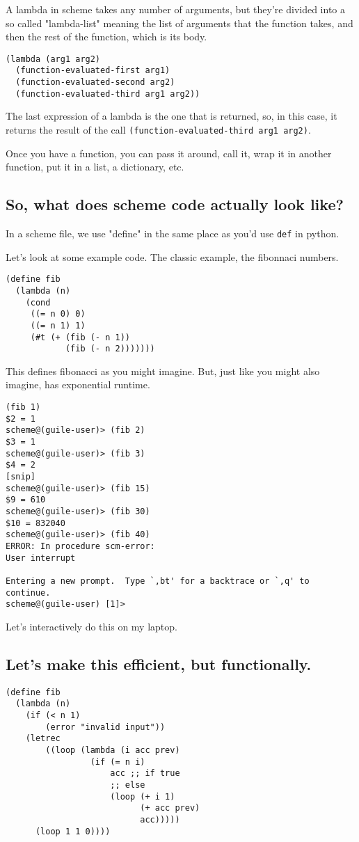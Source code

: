 \documentclass[11pt]{article}
\begin{document}
A lambda in scheme takes any number of arguments, but they're
divided into a so called "lambda-list" meaning the list of
arguments that the function takes, and then the rest of the
function, which is its body. 

\begin{verbatim}
(lambda (arg1 arg2)
  (function-evaluated-first arg1)
  (function-evaluated-second arg2)
  (function-evaluated-third arg1 arg2))
\end{verbatim}

The last expression of a lambda is the one that is returned, so, in
this case, it returns the result of the call
\texttt{(function-evaluated-third arg1 arg2)}.

Once you have a function, you can pass it around, call it, wrap it
in another function, put it in a list, a dictionary, etc.

\subsection{So, what does scheme code actually look like?}
\label{sec:org3467771}
In a scheme file, we use "define" in the same place as you'd use
\texttt{def} in python.

Let's look at some example code. The classic example, the fibonnaci numbers.

\begin{verbatim}
(define fib
  (lambda (n)
    (cond
     ((= n 0) 0) 
     ((= n 1) 1)
     (#t (+ (fib (- n 1))
            (fib (- n 2)))))))
\end{verbatim}
This defines fibonacci as you might imagine. But, just like you
might also imagine, has exponential runtime.
\begin{verbatim}
(fib 1)
$2 = 1
scheme@(guile-user)> (fib 2)
$3 = 1
scheme@(guile-user)> (fib 3)
$4 = 2
[snip]
scheme@(guile-user)> (fib 15)
$9 = 610
scheme@(guile-user)> (fib 30)
$10 = 832040
scheme@(guile-user)> (fib 40)
ERROR: In procedure scm-error:
User interrupt

Entering a new prompt.  Type `,bt' for a backtrace or `,q' to continue.
scheme@(guile-user) [1]> 
\end{verbatim}
Let's interactively do this on my laptop.

\subsection{Let's make this efficient, but functionally.}
\label{sec:orgb1caac7}
\begin{verbatim}
(define fib
  (lambda (n)
    (if (< n 1)
        (error "invalid input"))
    (letrec
        ((loop (lambda (i acc prev)
                 (if (= n i)
                     acc ;; if true
                     ;; else
                     (loop (+ i 1)
                           (+ acc prev)
                           acc)))))
      (loop 1 1 0))))
\end{verbatim}
\end{document}
